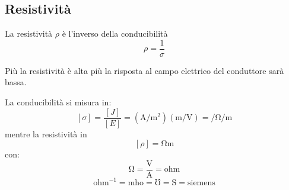 \subsection{Resistività }
\begin{Def}
  La resistività $\rho$ è l'inverso della conducibilità
  \[\rho=\frac{1}{\sigma}\]
\end{Def}
Più la resistività è alta più la risposta al campo elettrico del conduttore sarà bassa.

La conducibilità si misura in:
\[[\sigma]=\frac{[J]}{[E]}=(\si{\ampere\per\metre\squared})(\si{\meter\per\volt})=\si{\per\ohm\per\metre}\]
mentre la resistività in
\[[\rho]=\si{\ohm\meter}\]
con:
\[\si{\ohm}=\frac{\si{\volt}}{\si{\ampere}}=\text{ohm}\]
\[\text{ohm}^{-1}=\text{mho}=\si{\mho}=\si{\siemens}=\text{siemens}\]
